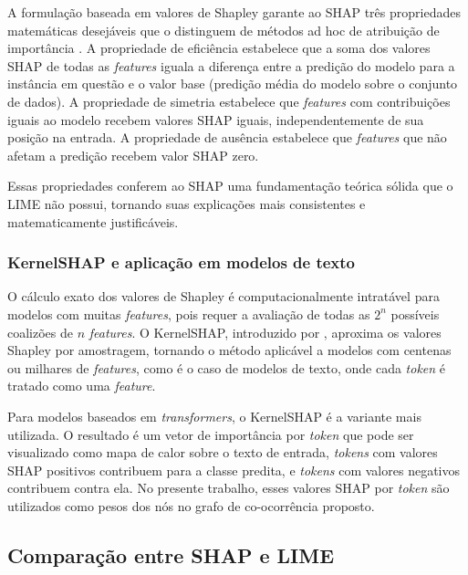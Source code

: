 \documentclass[
    12pt,                %
    openright,           %
    oneside,             %
    a4paper,             %
    english,             %
    brazil               %
]{abntex2}
\begin{document}
A formulação baseada em valores de Shapley garante ao SHAP três propriedades matemáticas desejáveis que o distinguem de métodos ad hoc de atribuição de importância \cite{lundberg2017}. A propriedade de eficiência estabelece que a soma dos valores SHAP de todas as \textit{features} iguala a diferença entre a predição do modelo para a instância em questão e o valor base (predição média do modelo sobre o conjunto de dados). A propriedade de simetria estabelece que \textit{features} com contribuições iguais ao modelo recebem valores SHAP iguais, independentemente de sua posição na entrada. A propriedade de ausência estabelece que \textit{features} que não afetam a predição recebem valor SHAP zero.

Essas propriedades conferem ao SHAP uma fundamentação teórica sólida que o LIME não possui, tornando suas explicações mais consistentes e matematicamente justificáveis.

\subsubsection{KernelSHAP e aplicação em modelos de texto}
\label{subsubsec:shap_kernel}

O cálculo exato dos valores de Shapley é computacionalmente intratável para modelos com muitas \textit{features}, pois requer a avaliação de todas as $2^n$ possíveis coalizões de $n$ \textit{features}. O KernelSHAP, introduzido por , aproxima os valores Shapley por amostragem, tornando o método aplicável a modelos com centenas ou milhares de \textit{features}, como é o caso de modelos de texto, onde cada \textit{token} é tratado como uma \textit{feature}.

Para modelos baseados em \textit{transformers}, o KernelSHAP é a variante mais utilizada. O resultado é um vetor de importância por \textit{token} que pode ser visualizado como mapa de calor sobre o texto de entrada, \textit{tokens} com valores SHAP positivos contribuem para a classe predita, e \textit{tokens} com valores negativos contribuem contra ela. No presente trabalho, esses valores SHAP por \textit{token} são utilizados como pesos dos nós no grafo de co-ocorrência proposto.

\subsection{Comparação entre SHAP e LIME}
\label{subsec:shap_lime}
\end{document}
